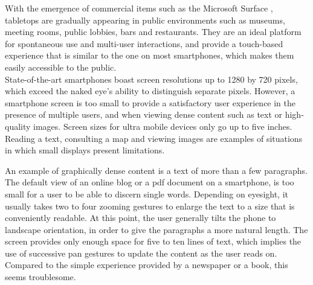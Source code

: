 With the emergence of commercial items such as the Microsoft Surface \citeyearpar{ms}, tabletops are gradually appearing in public environments such as museums, meeting rooms, public lobbies, bars and restaurants.
They are an ideal platform for spontaneous use and multi-user interactions, and provide a touch-based experience that is similar to the one on most smartphones, which makes them easily accessible to the public.\\
\linebreak
%
%
State-of-the-art smartphones boast screen resolutions up to 1280 by 720 pixels, which exceed the naked eye's ability to distinguish separate pixels.
However, a smartphone screen is too small to provide a satisfactory user experience in the presence of multiple users, and when viewing dense content such as text or high-quality images.
Screen sizes for ultra mobile devices only go up to five inches.
Reading a text, consulting a map and viewing images are examples of situations in which small displays present limitations.

An example of graphically dense content is a text of more than a few paragraphs.
The default view of an online blog or a pdf document on a smartphone, is too small for a user to be able to discern single words.
Depending on eyesight, it usually takes two to four zooming gestures to enlarge the text to a size that is conveniently readable.
At this point, the user generally tilts the phone to landscape orientation, in order to give the paragraphs a more natural length.
The screen provides only enough space for five to ten lines of text, which implies the use of successive pan gestures to update the content as the user reads on.
Compared to the simple experience provided by a newspaper or a book, this seems troublesome.

